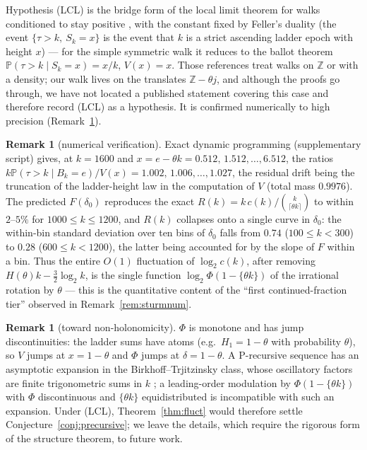 \documentclass[11pt]{article}
\theoremstyle{definition}
\newtheorem{remark}[theorem]{Remark}
\newcommand{\Prob}{\mathbb{P}}
\newcommand{\ceil}[1]{\lceil #1\rceil}
\begin{document}
Hypothesis (LCL) is the bridge form of the local limit theorem for walks
conditioned to stay positive \cite{Caravenna2005,VatutinWachtel2009},
with the constant fixed by Feller's duality (the event $\{\tau>k,\ S_k=x\}$
is the event that $k$ is a strict ascending ladder epoch with height $x$)
--- for the simple symmetric walk it reduces to the ballot theorem
$\Prob(\tau>k\mid S_k=x)=x/k$, $V(x)=x$. Those references treat walks on
$\mathbb Z$ or with a density; our walk lives on the translates
$\mathbb Z-\theta j$, and although the proofs go through, we have not
located a published statement covering this case and therefore record
(LCL) as a hypothesis. It is confirmed numerically to high precision
(Remark~\ref{rem:fluctnum}).

\begin{remark}[numerical verification]\label{rem:fluctnum}
Exact dynamic programming (supplementary script) gives, at $k=1600$ and
$x=e-\theta k=0.512,\,1.512,\ldots,6.512$, the ratios
$k\Prob(\tau>k\mid B_k=e)/V(x)=1.002,\,1.006,\ldots,1.027$, the residual
drift being the truncation of the ladder-height law in the computation
of $V$ (total mass $0.9976$). The predicted $F(\delta_0)$ reproduces the
exact $R(k)=k\,c(k)/\binom{k}{\ceil{\theta k}}$ to within $2$--$5\%$ for
$1000\le k\le 1200$, and $R(k)$ collapses onto a single curve in
$\delta_0$: the within-bin standard deviation over ten bins of $\delta_0$
falls from $0.74$ ($100\le k<300$) to $0.28$ ($600\le k<1200$), the
latter being accounted for by the slope of $F$ within a bin. Thus the
entire $O(1)$ fluctuation of $\log_2c(k)$, after removing
$H(\theta)k-\tfrac32\log_2k$, is the single function
$\log_2\Phi(1-\{\theta k\})$ of the irrational rotation by $\theta$ ---
this is the quantitative content of the ``first continued-fraction
tier'' observed in Remark~\ref{rem:sturmnum}.
\end{remark}

\begin{remark}[toward non-holonomicity]\label{rem:fluctholo}
$\Phi$ is monotone and has jump discontinuities: the ladder sums have
atoms (e.g.\ $H_1=1-\theta$ with probability $\theta$), so $V$ jumps at
$x=1-\theta$ and $\Phi$ jumps at $\delta=1-\theta$. A P-recursive sequence
has an asymptotic expansion in the Birkhoff--Trjitzinsky class, whose
oscillatory factors are finite trigonometric sums in $k$
\cite{FlajoletGerholdSalvy2005}; a leading-order modulation by
$\Phi(1-\{\theta k\})$ with $\Phi$ discontinuous and $\{\theta k\}$
equidistributed is incompatible with such an expansion. Under (LCL),
Theorem~\ref{thm:fluct} would therefore settle
Conjecture~\ref{conj:precursive}; we leave the details, which require
the rigorous form of the structure theorem, to future work.
\end{remark}
\end{document}
